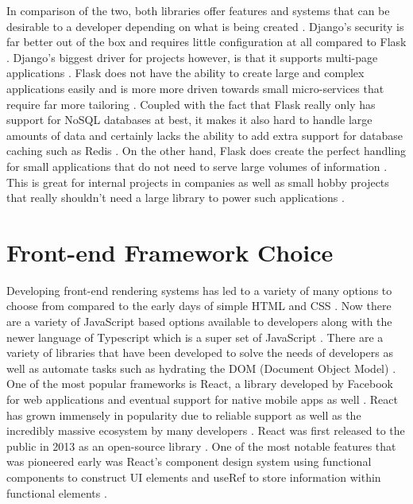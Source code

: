 \newline
\newline
In comparison of the two, both libraries offer features and systems that can be desirable to a developer depending on what is being created \cite{Khatri_Johns_2023}. Django’s security is far better out of the box and requires little configuration at all compared to Flask \cite{Khatri_Johns_2023}. Django’s biggest driver for projects however, is that it supports multi-page applications \cite{Ravindran_2018}. Flask does not have the ability to create large and complex applications easily and is more more driven towards small micro-services that require far more tailoring \cite{Chou_Chen_Ding_Tu_Xu_2013, Khatri_Johns_2023}. Coupled with the fact that Flask really only has support for NoSQL databases at best, it makes it also hard to handle large amounts of data and certainly lacks the ability to add extra support for database caching such as Redis \cite{Khatri_Johns_2023}.
\newline
\newline
On the other hand, Flask does create the perfect handling for small applications that do not need to serve large volumes of information \cite{Khatri_Johns_2023}. This is great for internal projects in companies as well as small hobby projects that really shouldn't need a large library to power such applications \cite{Challapalli_Kaushik_Suman_Shivahare_Bibhu_Gupta_2021, Ravindran_2018, Khatri_Johns_2023}.

\section{Front-end Framework Choice}

Developing front-end rendering systems has led to a variety of many options to choose from compared to the early days of simple HTML and CSS \cite{Xu_2021}.  Now there are a variety of JavaScript based options available to developers along with the newer language of Typescript which is a super set of JavaScript \cite{Constantinides_2004}. There are a variety of libraries that have been developed to solve the needs of developers as well as automate tasks such as hydrating the DOM (Document Object Model) \cite{Xu_2021}.
\newline
\newline
One of the most popular frameworks is React, a library developed by Facebook for web applications and eventual support for native mobile apps as well \cite{Xu_2021, Clark}. React has grown immensely in popularity due to reliable support as well as the incredibly massive ecosystem by many developers \cite{Clark}. React was first released to the public in 2013 as an open-source library \cite{Clark, Dhaduk_2023}. One of the most notable features that was pioneered early was React’s component design system using functional components to construct UI elements and useRef to store information within functional elements \cite{Clark}.


